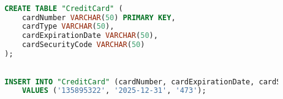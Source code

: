 
\usepackage{listings}



{
    \begin{lstlisting}[language=SQL, label=lst:sqlCode1_tmpname]

        CREATE TABLE "CreditCard" (
	        cardNumber VARCHAR(50) PRIMARY KEY,
	        cardType VARCHAR(50),
	        cardExpirationDate VARCHAR(50),
	        cardSecurityCode VARCHAR(50)
        );

    \end{lstlisting}
}

{
    \begin{lstlisting}[language=SQL, label=lst:sqlCode2_tmpname]

        INSERT INTO "CreditCard" (cardNumber, cardExpirationDate, cardSecurityCode)
            VALUES ('135895322', '2025-12-31', '473');

    \end{lstlisting}
}